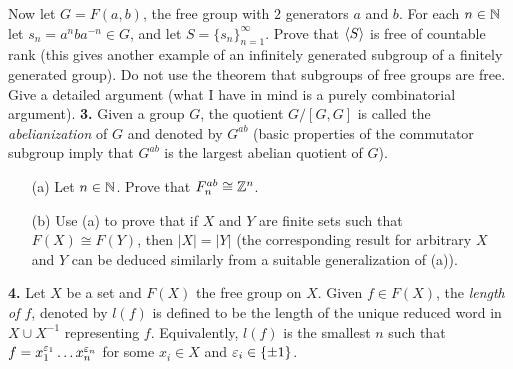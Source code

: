 \documentclass[12pt]{amsart}
\begin{document}
\sk Now let $G=F(a,b)$, the free group with $2$ generators $a$ and $b$. For each $n\in{\mathbb N}$ let $s_n=a^n b a^{-n}\in G$, and let
$S=\{s_n\}_{n=1}^{\infty}$. Prove that ${\langle} S{\rangle}$ is free of countable rank (this gives another example of an infinitely generated subgroup of a finitely generated group). Do not use the theorem that subgroups of free groups are free. Give a detailed argument (what I have in mind is a purely combinatorial argument).
\skv
{\bf 3.} Given a group $G$, the quotient $G/[G,G]$ is called the {\it abelianization} of $G$ and denoted by $G^{ab}$ (basic properties of the commutator subgroup imply that $G^{ab}$ is the largest abelian quotient of $G$).
\begin{itemize}
\item[(a)] Let $n\in{\mathbb N}$. Prove that $F_n^{ab}\cong {\mathbb Z}^n$.
\item[(b)] Use (a) to prove that if $X$ and $Y$ are finite sets such that $F(X)\cong F(Y)$, then $|X|=|Y|$ (the corresponding result for arbitrary $X$ and $Y$ can be deduced similarly from a suitable generalization of (a)).
\end{itemize}

{\bf 4.} Let $X$ be a set and $F(X)$ the free group on $X$.
Given $f\in F(X)$, the {\it length of $f$}, denoted by $l(f)$ is defined to be
the length of the unique reduced word in $X\cup X^{-1}$ representing $f$. Equivalently,
$l(f)$ is the smallest $n$ such that $f=x_1^{{\varepsilon}_1}\ldots x_n^{{\varepsilon}_n}$
for some $x_i\in X$ and ${\varepsilon}_i\in\{\pm 1\}$.
\end{document}
